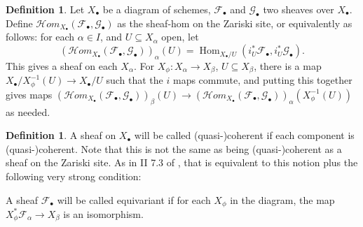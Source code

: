 \documentclass{report}
\theoremstyle{definition}
\newtheorem{definition}[theorem]{Definition}
\DeclareMathOperator{\Hom}{Hom}
\newcommand{\cHom}{\mathcal{H} \textit{om}}
\newcommand{\FF}{\mathscr{F}}
\newcommand{\GG}{\mathscr{G}}
\begin{document}
\begin{definition}
	Let $X_\bullet$ be a diagram of schemes, $\FF_\bullet$ and $\GG_\bullet$ two sheaves over $X_\bullet$.
	Define $\cHom_{X_\bullet}(\FF_\bullet, \GG_\bullet)$ as the sheaf-hom on the Zariski site, or equivalently as follows: for each $\alpha \in I$, and $U \subseteq X_\alpha$ open, let
	\[
		(\cHom_{X_\bullet}(\FF_\bullet, \GG_\bullet))_\alpha(U) = \Hom_{X_\bullet/U} ( i_U^* \FF_\bullet , i_U^* \GG_\bullet).
	\]
	This gives a sheaf on each $X_\alpha$.
	For $X_\phi : X_\alpha \rightarrow X_\beta$, $U \subseteq X_\beta$, there is a map $X_\bullet / X_\phi^{-1}(U) \rightarrow X_\bullet / U$ such that the $i$ maps commute, and putting this together gives maps $(\cHom_{X_\bullet}(\FF_\bullet, \GG_\bullet))_\beta(U) \rightarrow (\cHom_{X_\bullet}(\FF_\bullet, \GG_\bullet))_\alpha(X_\phi^{-1}(U))$ as needed.
\end{definition}

\begin{definition}
	A sheaf on $X_\bullet$ will be called (quasi-)coherent if each component is (quasi-)coherent.
	Note that this is not the same as being (quasi-)coherent as a sheaf on the Zariski site.
	As in II 7.3 of \cite{Lipman2009}, that is equivalent to this notion plus the following very strong condition:
	
	A sheaf $\FF_\bullet$ will be called equivariant if for each $X_\phi$ in the diagram, the map $X_\phi^* \FF_\alpha \rightarrow X_\beta$ is an isomorphism.
\end{definition}
\end{document}
